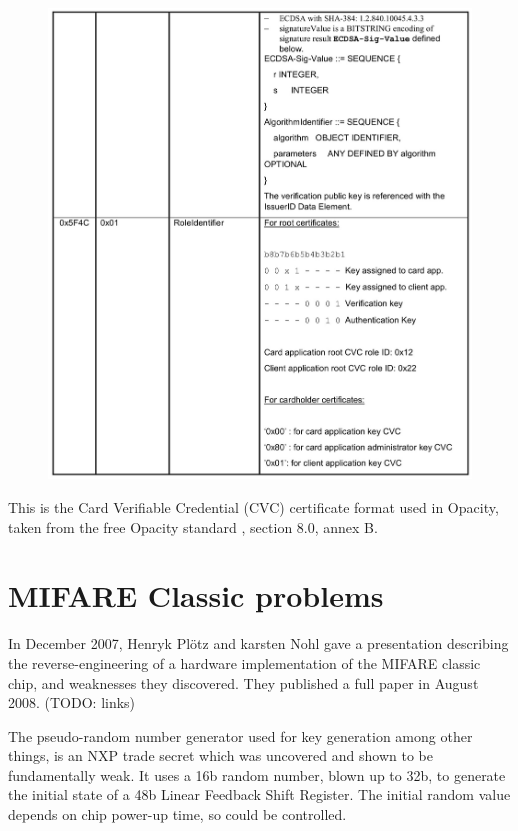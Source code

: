 \documentclass[12pt,a4paper]{article}
\begin{document}
\begin{figure} [h]
	\center
	\includegraphics[scale=0.4]{appendix/cvc-2}
	
\end{figure}
\pagebreak
This is the Card Verifiable Credential (CVC) certificate format used in Opacity, taken from the free Opacity standard \cite{opacityfree}, section 8.0, annex B.


\pagebreak

\section{MIFARE Classic problems}
\label{sec:mifare_problems}

In December 2007, Henryk Pl\"otz and karsten Nohl gave a presentation describing the reverse-engineering of a hardware implementation of the MIFARE classic chip, and weaknesses they discovered. They published a full paper in August 2008. (TODO: links)

The pseudo-random number generator used for key generation among other things, is an NXP trade secret which was uncovered and shown to be fundamentally weak. It uses a 16b random number, blown up to 32b, to generate the initial state of a 48b Linear Feedback Shift Register. The initial random value depends on chip power-up time, so could be controlled. 
\end{document}

